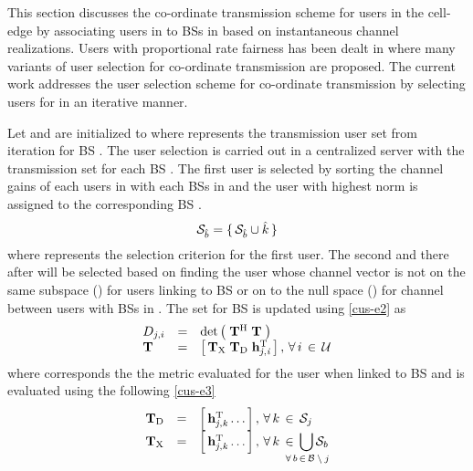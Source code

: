 
This section discusses the co-ordinate transmission scheme for users in the cell-edge by associating users in  to BSs in  based on instantaneous channel realizations. Users with proportional rate fairness has been dealt in \cite{antti_coord_user_selection} where many variants of user selection for co-ordinate transmission are proposed. The current work addresses the user selection scheme for co-ordinate transmission by selecting users for  in an iterative manner.

Let  and  are initialized to  where  represents the transmission user set from  iteration for BS . The user selection is carried out in a centralized server with the transmission set  for each BS . The first user is selected by sorting the channel gains of each users in  with each BSs in  and the user  with highest norm is assigned to the corresponding BS .
\begin{equation}
\mathcal{S}_{\hat{b}} = \lbrace \, \mathcal{S}_{\hat{b}} \cup \hat{k} \, \rbrace
\label{cus-e1}
\end{equation}
where  represents the selection criterion for the first user. The second and there after will be selected based on finding the user whose channel vector is not on the same subspace () for users linking to BS  or on to the null space () for channel between users with BSs in . The set  for BS  is updated using \eqref{cus-e2} as
\begin{equation}
\begin{array}{lcl}
D_{j,i} &=& \det \left ( \; \mathbf{T}^{\mathrm{H}} \; \mathbf{T} \; \right ) \\
\mathbf{T} &=& \left [ \, \mathbf{T}_{\mathrm{X}} \; \mathbf{T}_{\mathrm{D}} \; \mathbf{h}_{\mathit{j},\mathit{i}}^{\mathrm{T}} \, \right ], \, \forall \, i \, \in \, \mathcal{U}
\end{array}
\label{cus-e2}
\end{equation}
where  corresponds the the metric evaluated for the user  when linked to BS  and  is evaluated using the following \eqref{cus-e3}
\begin{equation}
\begin{array}{lcl}
\mbf{T}_{\mrm{D}} &=& \matscont{\mvecxyz{h}{j}{k}^\mrm{T} \dotso}, \fall k \inm \mc{S}_j \\
\mbf{T}_{\mrm{X}} &=& \matscont{\mvecxyz{h}{j}{k}^\mrm{T} \dotso }, \fall k \inm \displaystyle \bigcup_{\mathclap{\fall b \inm \mc{B} \bs j}} \mc{S}_b
\end{array}
\label{cus-e3}
\end{equation}
